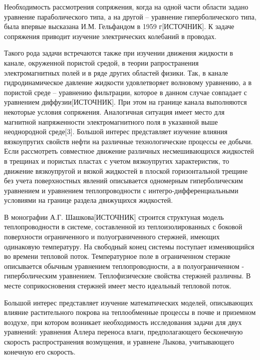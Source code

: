 \newpage

\begin{center}
\end{center}

Необходимость рассмотрения сопряжения, когда на одной части области задано уравнение параболического типа, а на другой -- уравнение гиперболического типа, была впервые высказана И.М. Гельфандом в 1959 г[ИСТОЧНИК]. К задаче сопряжения приводит изучение электрических колебаний в проводах.

Такого рода задачи встречаются также при изучении движения жидкости в канале, окруженной пористой средой, в теории рапространения электромагнитных полей и в ряде других областей физики. Так, в канале гидродинамическое давление жидкости удовлетворяет волновому уравнению, а в пористой среде -- уравнению фильтрации, которое в данном случае совпадает с уравнением диффузии[ИСТОЧНИК]. При этом на границе канала выполняются некоторые условия сопряжения. Аналогичная ситуация имеет место для магнитной напряженности электромагнитного поля в указанной выше неоднородной среде[3]. Большой интерес представляет изучение влияния вязкоупругих свойств нефти на различные технологические процессы ее добычи. Если рассмотреть совместное движение различных несмешивающихся жидкостей в трещинах и пористых пластах с учетом вязкоупругих характеристик, то движение вязкоупругой и вязкой жидкостей в плоской горизонтальной трещине без учета поверхностных явлений описывается одномерным гиперболическим уравнением и уравнением теплопроводности с интегро-дифференциальными условиями на границе раздела движущихся жидкостей.

В монографии А.Г. Шашкова[ИСТОЧНИК] строится структуная модель теплопроводности в системе, составленной из теплоизолированных с боковой поверхности ограниченного и полуограниченного стержней, имеющих одинаковую температуру. На свободный конец системы поступает изменяющийся во времени тепловой поток. Температурное поле в ограниченном стержне описывается обычным уравнением теплопроводности, а в полуограниченном - гиперболическим уравнением. Теплофизические свойства стержней различны. В месте соприкосновения стержней имеет место идеальный тепловой поток. 

Большой интерес представляет изучение математических моделей, описывающих влияние растительного покрова на теплообменные процессы в почве и приземном воздухе, при котором возникает необходимость исследования задачи для двух уравнений: уравнения Аллера переноса влаги, предполагающего бесконечную скорость распространения возмущения, и уравнене Лыкова, учитывающего конечную его скорость.

